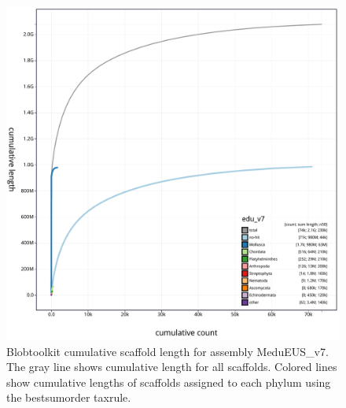 \documentclass[11pt, a4paper]{article}
\begin{document}
\begin{figure}
	\includegraphics[width=\linewidth]{figures/btk_cumulative_MeduEUS_v7}
	\caption{Blobtoolkit cumulative scaffold length for assembly MeduEUS\_v7. The gray line shows cumulative length for all scaffolds. Colored lines show cumulative lengths of scaffolds assigned to each phylum using the bestsumorder taxrule.}
	\label{supfig:btk-cumul-MeduEUS}
\end{figure}
\end{document}
